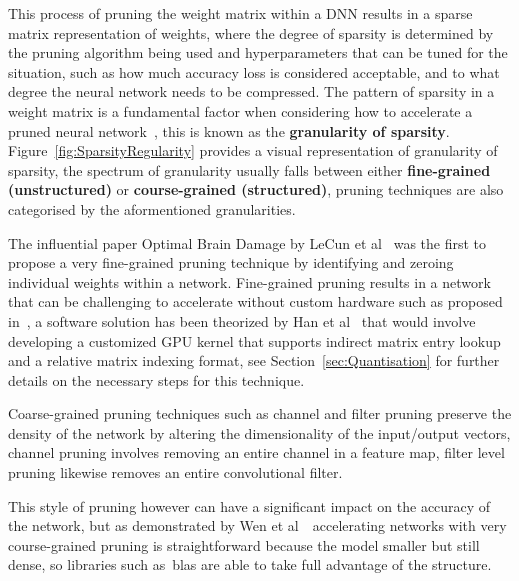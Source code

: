 \documentclass[../../D1.tex]{subfiles}
\begin{document}
This process of pruning the weight matrix within a DNN results in a sparse matrix representation of weights, where the degree of sparsity is determined by the pruning algorithm being used and hyperparameters that can be tuned for the situation, such as how much accuracy loss is considered acceptable, and to what degree the neural network needs to be compressed. 
The pattern of sparsity in a weight matrix is a fundamental factor when considering how to accelerate a pruned neural network~\autocite{maoExploringRegularitySparse2017}, this is known as the \textbf{granularity of sparsity}.
Figure~\ref{fig:SparsityRegularity} provides a visual representation of granularity of sparsity, the spectrum of granularity usually falls between either \textbf{fine-grained (unstructured)} or \textbf{course-grained (structured)}, pruning techniques are also categorised by the aformentioned granularities.


The influential paper Optimal Brain Damage by LeCun et al~\autocite{lecunOptimalBrainDamage} was the first to propose a very fine-grained pruning technique by identifying and zeroing individual weights within a network.
Fine-grained pruning results in a network that can be challenging to accelerate without custom hardware such as proposed in~\autocite{hanEIEEfficientInference2016,parasharSCNNAcceleratorCompressedsparse2017}, a software solution has been theorized by Han et al~\autocite{hanDeepCompressionCompressing2016} that would involve developing a customized GPU kernel that supports indirect matrix entry lookup and a relative matrix indexing format, see Section~\ref{sec:Quantisation} for further details on the necessary steps for this technique.


Coarse-grained pruning techniques such as channel and filter pruning preserve the density of the network by altering the dimensionality of the input/output vectors, channel pruning involves removing an entire channel in a feature map, filter level pruning likewise removes an entire convolutional filter. 

This style of pruning however can have a significant impact on the accuracy of the network, but as demonstrated by Wen et al~\autocite{wenLearningStructuredSparsity2016}~accelerating networks with very course-grained pruning is straightforward because the model smaller but still dense, so libraries such as~\acrshort{blas} are able to take full advantage of the structure. 
\end{document}
